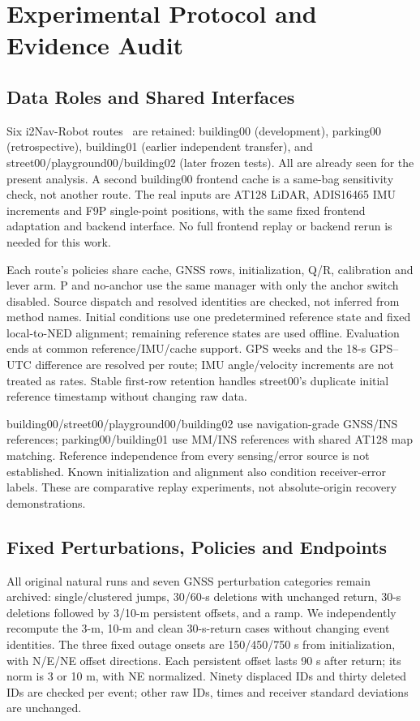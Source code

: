 \documentclass[conference]{IEEEtran}
\begin{document}
\section{Experimental Protocol and Evidence Audit}
\subsection{Data Roles and Shared Interfaces}
Six i2Nav-Robot routes~\cite{i2nav} are retained: building00 (development), parking00 (retrospective), building01 (earlier independent transfer), and street00/playground00/building02 (later frozen tests). All are already seen for the present analysis. A second building00 frontend cache is a same-bag sensitivity check, not another route. The real inputs are AT128 LiDAR, ADIS16465 IMU increments and F9P single-point positions, with the same fixed frontend adaptation and backend interface. No full frontend replay or backend rerun is needed for this work.

Each route's policies share cache, GNSS rows, initialization, Q/R, calibration and lever arm. P and no-anchor use the same manager with only the anchor switch disabled. Source dispatch and resolved identities are checked, not inferred from method names. Initial conditions use one predetermined reference state and fixed local-to-NED alignment; remaining reference states are used offline. Evaluation ends at common reference/IMU/cache support. GPS weeks and the 18-s GPS--UTC difference are resolved per route; IMU angle/velocity increments are not treated as rates. Stable first-row retention handles street00's duplicate initial reference timestamp without changing raw data.

building00/street00/playground00/building02 use navigation-grade GNSS/INS references; parking00/building01 use MM/INS references with shared AT128 map matching. Reference independence from every sensing/error source is not established. Known initialization and alignment also condition receiver-error labels. These are comparative replay experiments, not absolute-origin recovery demonstrations.

\subsection{Fixed Perturbations, Policies and Endpoints}
All original natural runs and seven GNSS perturbation categories remain archived: single/clustered jumps, 30/60-s deletions with unchanged return, 30-s deletions followed by 3/10-m persistent offsets, and a ramp. We independently recompute the 3-m, 10-m and clean 30-s-return cases without changing event identities. The three fixed outage onsets are 150/450/750 s from initialization, with N/E/NE offset directions. Each persistent offset lasts 90 s after return; its norm is 3 or 10 m, with NE normalized. Ninety displaced IDs and thirty deleted IDs are checked per event; other raw IDs, times and receiver standard deviations are unchanged.
\end{document}

